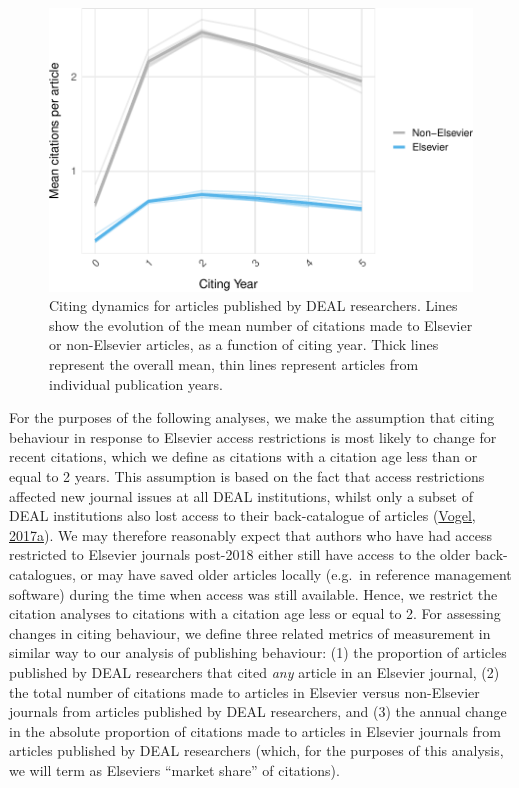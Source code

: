 \documentclass[
]{article}
\begin{document}
\begin{figure}

{\centering \includegraphics[width=0.5\linewidth]{analysis_files/figure-latex/references-publisher-year-cityear-1} 

}

\caption{Citing dynamics for articles published by DEAL researchers. Lines show the evolution of the mean number of citations made to Elsevier or non-Elsevier articles, as a function of citing year. Thick lines represent the overall mean, thin lines represent articles from individual publication years.}\label{fig:references-publisher-year-cityear}
\end{figure}

For the purposes of the following analyses, we make the assumption that citing behaviour in response to Elsevier access restrictions is most likely to change for recent citations, which we define as citations with a citation age less than or equal to 2 years. This assumption is based on the fact that access restrictions affected new journal issues at all DEAL institutions, whilst only a subset of DEAL institutions also lost access to their back-catalogue of articles (\href{https://doi.org/10.1126/science.355.6320.17}{Vogel, 2017a}). We may therefore reasonably expect that authors who have had access restricted to Elsevier journals post-2018 either still have access to the older back-catalogues, or may have saved older articles locally (e.g.~in reference management software) during the time when access was still available. Hence, we restrict the citation analyses to citations with a citation age less or equal to 2. For assessing changes in citing behaviour, we define three related metrics of measurement in similar way to our analysis of publishing behaviour: (1) the proportion of articles published by DEAL researchers that cited \emph{any} article in an Elsevier journal, (2) the total number of citations made to articles in Elsevier versus non-Elsevier journals from articles published by DEAL researchers, and (3) the annual change in the absolute proportion of citations made to articles in Elsevier journals from articles published by DEAL researchers (which, for the purposes of this analysis, we will term as Elsevier\textquotesingle s ``market share'' of citations).
\end{document}

